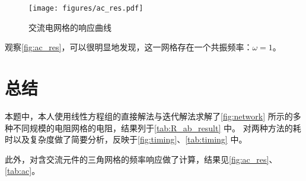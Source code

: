 \begin{figure}
    \centering
    \texttt{[image: figures/ac\_res.pdf]}
    \caption{交流电网格的响应曲线}
    \label{fig:ac_res}
\end{figure}

观察\autoref{fig:ac_res}，可以很明显地发现，这一网格存在一个共振频率：$\omega=1$。

\section{总结}
本题中，本人使用线性方程组的直接解法与迭代解法求解了\autoref{fig:network} 所示的多种不同规模的电阻网格的电阻，结果列于\autoref{tab:R_ab_result} 中。
对两种方法的耗时以及复杂度做了简要分析，反映于\autoref{fig:timing}、\autoref{tab:timing} 中。

此外，对含交流元件的三角网格的频率响应做了计算，结果见\autoref{fig:ac_res}、\autoref{tab:ac}。
